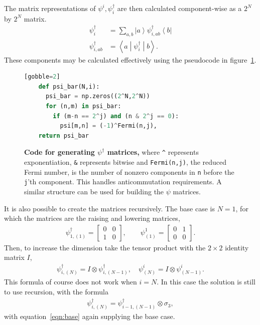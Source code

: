 \documentclass[12pt]{article} %
\newcommand{\ket}[1]{\left|#1\right\rangle}
\newcommand{\bra}[1]{\left\langle#1\right|}
\newcommand{\brakett}[3]{\left\langle#1\middle|#2\middle|#3\right\rangle}
\newcommand{\nn}{\nonumber\\}
\begin{document}
The matrix representations of $\psi^i, \psi^\dag_i$ are then calculated component-wise as a $2^N$ by $2^N$ matrix.
\begin{align}
\psi^\dag_i &= \sum_{a,b}\ket{a}\psi^\dag_{i,ab}\bra{b}\nn
\psi^\dag_{i,ab} &= \brakett{a}{\psi^\dag_i}{b}.\label{eqn:comps}
\end{align}
These components may be calculated effectively using the pseudocode in figure~\ref{code:psibar}.

\begin{figure}[ht]
	\begin{lstlisting}[language=python][gobble=2]
    def psi_bar(N,i):
      psi_bar = np.zeros((2^N,2^N))
      for (n,m) in psi_bar:
        if (m-n == 2^j) and (n & 2^j == 0): 
          psi[m,n] = (-1)^Fermi(n,j),
    return psi_bar
	\end{lstlisting}
	\cprotect\caption{\textbf{Code for generating $\psi^\dag$ matrices,} where \verb|^| represents exponentiation, \verb|&| represents bitwise and \verb|Fermi(n,j)|, the reduced Fermi number, is the number of nonzero components in \verb|n| before the \verb|j|'th component. This handles anticommutation requirements. A similar structure can be used for building the $\psi$ matrices.}
	\label{code:psibar}
\end{figure}

It is also possible to create the matrices recursively. The base case is $N=1$, for which the matrices are the raising and lowering matrices,
\begin{align}
\psi^\dag_{1,(1)} = \begin{bmatrix} 0&0\\1&0 \end{bmatrix}, \qquad
    \psi^1_{(1)} = \begin{bmatrix} 0&1\\0&0 \end{bmatrix}. \label{eqn:base}
\end{align}
Then, to increase the dimension take the tensor product with the $2\times 2$ identity matrix $I$,
\begin{align}
\psi^\dag_{i,(N)} = I\otimes\psi^\dag_{i,(N-1)},\quad \psi^i_{(N)} = I\otimes 
	\psi^i_{(N-1)}.
\end{align}
This formula of course does not work when $i=N$. In this case the solution is still to use recursion, with the formula
\begin{align}
\psi^\dag_{i,(N)} = \psi^\dag_{i-1,(N-1)}\otimes\sigma_3,
\end{align}
with equation~\ref{eqn:base} again supplying the base case.
\end{document}
